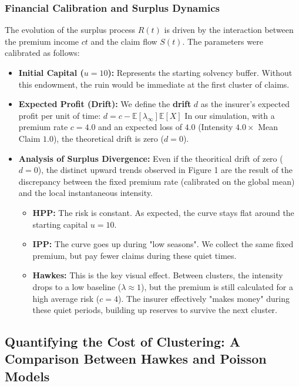 \documentclass[a4paper,11pt]{article}
\begin{document}
\subsubsection*{Financial Calibration and Surplus Dynamics}
The evolution of the surplus process $R(t)$ is driven by the interaction between the premium income $ct$ and the claim flow $S(t)$. The parameters were calibrated as follows:
\begin{itemize}
    \item \textbf{Initial Capital ($u=10$):} Represents the starting solvency buffer. Without this endowment, the ruin would be immediate at the first cluster of claims.
    \item \textbf{Expected Profit (Drift):} We define the \textbf{drift} $d$ as the insurer's expected profit per unit of time: $d = c - \mathbb{E}[\lambda_{\infty}] \mathbb{E}[X] $
    In our simulation, with a premium rate $c=4.0$ and an expected loss of $4.0$ (Intensity $4.0 \times$ Mean Claim $1.0$), the theoretical drift is zero ($d=0$).
     \item \textbf{Analysis of Surplus Divergence: } Even if the theoritical drift of zero ($d=0$), the distinct upward trends observed in Figure 1 are the result of the discrepancy between the fixed premium rate (calibrated on the global mean) and the local instantaneous intensity.
  \begin{itemize}
    \renewcommand\labelitemii{$\bullet$}
    \item \textbf{HPP:} The risk is constant. As expected, the curve stays flat around the starting capital $u=10$.

    \item \textbf{IPP:} The curve goes up during "low seasons". We collect the same fixed premium, but pay fewer claims during these quiet times.

    \item \textbf{Hawkes:} This is the key visual effect. Between clusters, the intensity drops to a low baseline ($\lambda \approx 1$), but the premium is still calculated for a high average risk ($c=4$). The insurer effectively "makes money" during these quiet periods, building up reserves to survive the next cluster.
  \end{itemize}
\end{itemize}

\subsection{Quantifying the Cost of Clustering: A Comparison Between Hawkes and Poisson Models}
\end{document}
